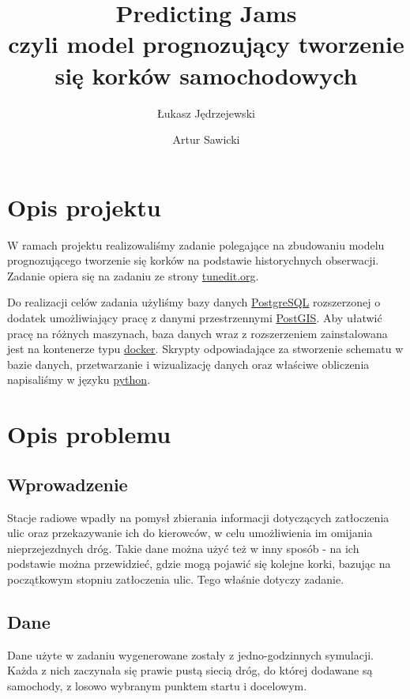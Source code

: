 \documentclass[a4paper,12pt]{mwart}
\begin{document}
\title{Predicting Jams\\%
{\large czyli model prognozujący tworzenie się korków samochodowych} }

\author{Łukasz Jędrzejewski \and Artur Sawicki}

\maketitle

\section{Opis projektu}
W ramach projektu realizowaliśmy zadanie polegające na zbudowaniu modelu prognozującego tworzenie się korków na podstawie historychnych obserwacji. Zadanie opiera się na zadaniu ze strony \href{http://tunedit.org/challenge/IEEE-ICDM-2010/jams}{tunedit.org}.

Do realizacji celów zadania użyliśmy bazy danych \href{https://www.postgresql.org/}{PostgreSQL} rozszerzonej o dodatek umożliwiający pracę z danymi przestrzennymi \href{http://postgis.net/}{PostGIS}. Aby ułatwić pracę na różnych maszynach, baza danych wraz z rozszerzeniem zainstalowana jest na kontenerze typu \href{https://www.docker.com/}{docker}. Skrypty odpowiadające za stworzenie schematu w bazie danych, przetwarzanie i wizualizację danych oraz właściwe obliczenia napisaliśmy w języku \href{https://www.python.org/}{python}.

\section{Opis problemu}
\subsection{Wprowadzenie}
Stacje radiowe wpadły na pomysł zbierania informacji dotyczących zatłoczenia ulic oraz przekazywanie ich do kierowców, w celu umożliwienia im omijania nieprzejezdnych dróg. Takie dane można użyć też w inny sposób - na ich podstawie można przewidzieć, gdzie mogą pojawić się kolejne korki, bazując na początkowym stopniu zatłoczenia ulic. Tego właśnie dotyczy zadanie.

\subsection{Dane}
Dane użyte w zadaniu wygenerowane zostały z jedno-godzinnych symulacji. Każda z nich zaczynała się prawie pustą siecią dróg, do której dodawane są samochody, z losowo wybranym punktem startu i docelowym.
\end{document}
